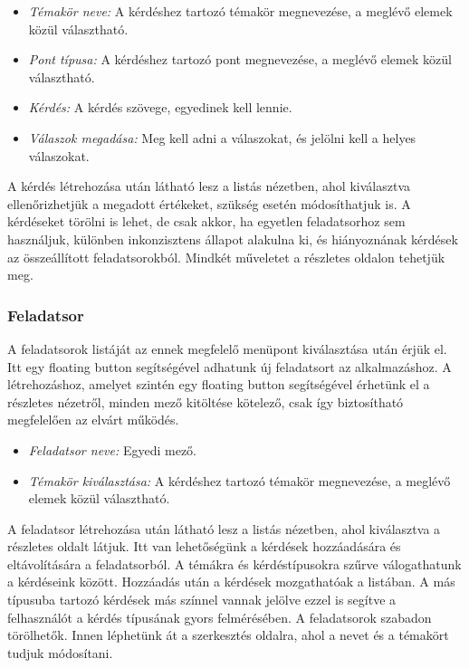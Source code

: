 \begin{itemize}
    \item \emph{Témakör neve:} A kérdéshez tartozó témakör megnevezése, a meglévő elemek közül választható.
    \item \emph{Pont típusa:} A kérdéshez tartozó pont megnevezése, a meglévő elemek közül választható.
    \item \emph{Kérdés:} A kérdés szövege, egyedinek kell lennie.
    \item \emph{Válaszok megadása:} Meg kell adni a válaszokat, és jelölni kell a helyes válaszokat.
\end{itemize}

A kérdés létrehozása után látható lesz a listás nézetben, ahol kiválasztva ellenőrizhetjük a megadott értékeket, szükség esetén módosíthatjuk is.
A kérdéseket törölni is lehet, de csak akkor, ha egyetlen feladatsorhoz sem használjuk, különben inkonzisztens állapot alakulna ki, és hiányoznának kérdések az összeállított feladatsorokból.
Mindkét műveletet a részletes oldalon tehetjük meg.

\subsubsection{Feladatsor}
\label{sec:SpecificationExamDescription}

A feladatsorok listáját az ennek megfelelő menüpont kiválasztása után érjük el.
Itt egy floating button segítségével adhatunk új feladatsort az alkalmazáshoz.
A létrehozáshoz, amelyet szintén egy floating button segítségével érhetünk el a részletes nézetről, minden mező kitöltése kötelező, csak így biztosítható megfelelően az elvárt működés.

\begin{itemize}
    \item \emph{Feladatsor neve:} Egyedi mező.
    \item \emph{Témakör kiválasztása:} A kérdéshez tartozó témakör megnevezése, a meglévő elemek közül választható.
\end{itemize}

A feladatsor létrehozása után látható lesz a listás nézetben, ahol kiválasztva a részletes oldalt látjuk.
Itt van lehetőségünk a kérdések hozzáadására és eltávolítására a feladatsorból.
A témákra és kérdéstípusokra szűrve válogathatunk a kérdéseink között.
Hozzáadás után a kérdések mozgathatóak a listában.
A más típusuba tartozó kérdések más színnel vannak jelölve ezzel is segítve a felhasználót a kérdés típusának gyors felmérésében.
A feladatsorok szabadon törölhetők.
Innen léphetünk át a szerkesztés oldalra, ahol a nevet és a témakört tudjuk módosítani.

